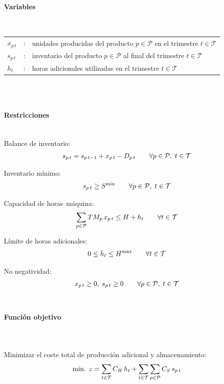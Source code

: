 \paragraph{Variables}\mbox{}\\

\begin{tabular}{l c l}
    $x_{p\,t}$ & : & unidades producidas del producto $p \in \mathcal{P}$ en el trimestre $t \in \mathcal{T}$ \\
    $s_{p\,t}$ & : & inventario del producto $p \in \mathcal{P}$ al final del trimestre $t \in \mathcal{T}$ \\
    $h_t$      & : & horas adicionales utilizadas en el trimestre $t \in \mathcal{T}$ \\
\end{tabular}
\\
\\

\paragraph{Restricciones}\mbox{}\\

Balance de inventario:
\begin{align}
s_{p\,t} = s_{p\,t-1} + x_{p\,t} - D_{p\,t} \qquad \forall p \in \mathcal{P},\; t \in \mathcal{T} \notag
\end{align}

Inventario mínimo:
\begin{align}
s_{p\,t} \ge S^{\min} \qquad \forall p \in \mathcal{P},\; t \in \mathcal{T} \notag
\end{align}

Capacidad de horas--máquina:
\begin{align}
\sum_{p \in \mathcal{P}} TM_p\,x_{p\,t} \le H + h_t \qquad \forall t \in \mathcal{T} \notag
\end{align}

Límite de horas adicionales:
\begin{align}
0 \le h_t \le H^{\max} \qquad \forall t \in \mathcal{T} \notag
\end{align}

No negatividad:
\begin{align}
x_{p\,t} \ge 0,\; s_{p\,t} \ge 0 \qquad \forall p \in \mathcal{P},\; t \in \mathcal{T} \notag
\end{align}
\\

\paragraph{Función objetivo}\mbox{}\\
\\
Minimizar el coste total de producción adicional y almacenamiento:
\begin{align}
\mbox{min. } z = \sum_{t \in \mathcal{T}} C_H\,h_t + \sum_{t \in \mathcal{T}} \sum_{p \in \mathcal{P}} C_S\,s_{p\,t} \notag
\end{align}

